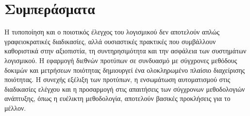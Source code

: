 \documentclass[
    language=greek,
    doctype=article,
]{../../omnilatex}
\begin{document}
\section{Συμπεράσματα}
Η τυποποίηση και ο ποιοτικός έλεγχος του λογισμικού δεν αποτελούν απλώς γραφειοκρατικές διαδικασίες, αλλά ουσιαστικές πρακτικές που συμβάλλουν καθοριστικά στην αξιοπιστία, τη συντηρησιμότητα και την ασφάλεια των συστημάτων λογισμικού. Η εφαρμογή διεθνών προτύπων σε συνδυασμό με σύγχρονες μεθόδους δοκιμών και μετρήσεων ποιότητας δημιουργεί ένα ολοκληρωμένο πλαίσιο διαχείρισης ποιότητας. Η συνεχής εξέλιξη των προτύπων, η ενσωμάτωση αυτοματισμού στις διαδικασίες ελέγχου και η προσαρμογή στις απαιτήσεις των σύγχρονων μεθοδολογιών ανάπτυξης, όπως η ευέλικτη μεθοδολογία, αποτελούν βασικές προκλήσεις για το μέλλον.
\end{document}
